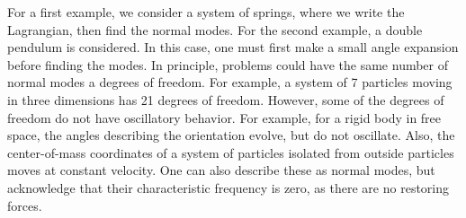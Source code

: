 For a first example, we consider a system of springs, where we write
the Lagrangian, then find the normal modes. For the second example, a
double pendulum is considered. In this case, one must first make a
small angle expansion before finding the modes. In principle, problems
could have the same number of normal modes a degrees of freedom. For
example, a system of 7 particles moving in three dimensions has 21
degrees of freedom. However, some of the degrees of freedom do not
have oscillatory behavior. For example, for a rigid body in free
space, the angles describing the orientation evolve, but do not
oscillate. Also, the center-of-mass coordinates of a system of
particles isolated from outside particles moves at constant
velocity. One can also describe these as normal modes, but acknowledge
that their characteristic frequency is zero, as there are no restoring
forces.

